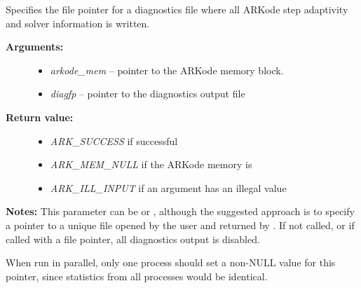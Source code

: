 \documentclass[letterpaper,10pt,english]{sphinxmanual}
\begin{document}
\begin{fulllineitems}
\label{c_interface/User_callable:ARKodeSetDiagnostics}
Specifies the file pointer for a diagnostics file where
all ARKode step adaptivity and solver information is written.
\begin{description}
\item[{\textbf{Arguments:}}] \leavevmode\begin{itemize}
\item {} 
\emph{arkode\_mem} -- pointer to the ARKode memory block.

\item {} 
\emph{diagfp} -- pointer to the diagnostics output file

\end{itemize}

\item[{\textbf{Return value:}}] \leavevmode\begin{itemize}
\item {} 
\emph{ARK\_SUCCESS} if successful

\item {} 
\emph{ARK\_MEM\_NULL} if the ARKode memory is 

\item {} 
\emph{ARK\_ILL\_INPUT} if an argument has an illegal value

\end{itemize}

\end{description}

\textbf{Notes:} This parameter can be  or , although the
suggested approach is to specify a pointer to a unique file opened
by the user and returned by .  If not called, or if called
with a  file pointer, all diagnostics output is disabled.

When run in parallel, only one process should set a non-NULL value
for this pointer, since statistics from all processes would be
identical.

\end{fulllineitems}

\end{document}
